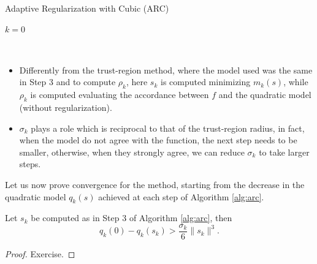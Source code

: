 \documentclass[10pt,a4paper]{article}
\begin{document}
\begin{algorithm}[H]\label{alg:arc}
	\caption{Adaptive Regularization with Cubic (ARC)}
	
	
	$k = 0$
	
	\While{$||\grad(x_k)||>\epsilon$}{
		
		Compute a step $s_k$ such that $m_k(s_k)\leq m_k(0)$ and $\|\nabla m_k(s_k)\|\leq \frac{1}{2}\theta ||s_k||^2$
		
		Compute $\rho_k:= \frac{f(x_k)-f(x_k+s_k)}{q_k(0)-q_k(s_k)}$
		
		\If{$\rho_k\geq \eta_1$}{$x_{k+1} = x_k +s_k$}
		
		\Else{$x_{k+1} = x_k$}
		
		$\sigma_{k+1} = \begin{cases}
			\max\{\gamma_1 \sigma_k, \sigma_{min} \} \quad &\text{if } \rho_k\geq \eta_2\\
			\sigma_k \quad &\text{if } \rho_k\in [\eta_1, \eta_2)\\
			\gamma_2 \sigma_k \quad &\text{if } \rho_k<\eta_1\\
		\end{cases}$
		
		$k = k+1$
	}
\end{algorithm}
\begin{remark}
	$ $
	\begin{itemize}
		\item Differently from the trust-region method, where the model used was the same in Step 3 and to compute $\rho_k$, here $s_k$ is computed minimizing $m_k(s)$, while $\rho_k$ is computed evaluating the accordance between $f$ and the quadratic model (without regularization). 
		\item $\sigma_k$ plays a role which is reciprocal to that of the trust-region radius, in fact, when the model do not agree with the function, the next step needs to be smaller, otherwise, when they strongly agree, we can reduce $\sigma_k$ to take larger steps. 
	\end{itemize}
\end{remark}

Let us now prove convergence for the method, starting from the decrease in the quadratic model $q_k(s)$ achieved at each step of Algorithm \ref{alg:arc}.

\begin{lemma}\label{eq:arc_decrease}
	Let $s_k$ be computed as in Step 3 of Algorithm \ref{alg:arc}, then
	\begin{equation*}
		q_k(0)- q_k(s_k) > \frac{\sigma_k}{6} \|s_k\|^3.
	\end{equation*}
\end{lemma}
\begin{proof}
	Exercise.
\end{proof}
\end{document}
